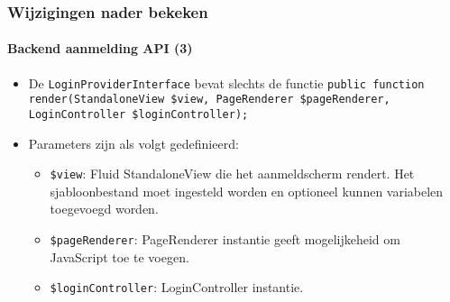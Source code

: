 \begin{frame}[fragile]
	\frametitle{Wijzigingen nader bekeken}
	\framesubtitle{Backend aanmelding API (3)}

	\begin{itemize}

		\item De \texttt{LoginProviderInterface} bevat slechts de functie\newline
			\smaller\texttt{public function render(StandaloneView \$view, PageRenderer \$pageRenderer, LoginController \$loginController);}\normalsize

		\item Parameters zijn als volgt gedefinieerd:

			\begin{itemize}

				\item \texttt{\$view}:\newline
					Fluid StandaloneView die het aanmeldscherm rendert. Het sjabloonbestand moet ingesteld worden
					en optioneel kunnen variabelen toegevoegd worden.

				\item \texttt{\$pageRenderer}:\newline
					PageRenderer instantie geeft mogelijkeheid om JavaScript toe te voegen.

				\item \texttt{\$loginController}:\newline
					LoginController instantie.

			\end{itemize}

	\end{itemize}

\end{frame}



